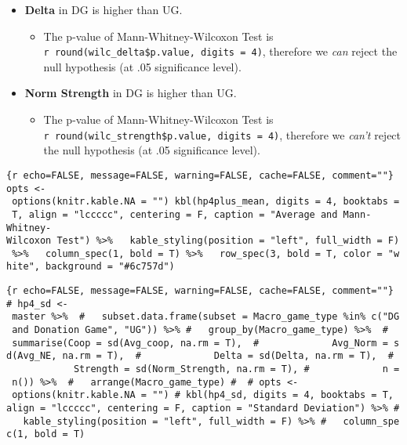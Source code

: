\begin{itemize}
\item
  \textbf{Delta} in DG is higher than UG.

  \begin{itemize}
  \tightlist
  \item
    The p-value of Mann-Whitney-Wilcoxon Test is
    \texttt{r\ round(wilc\_delta\$p.value,\ digits\ =\ 4)}, therefore we
    \emph{can} reject the null hypothesis (at .05 significance level).
  \end{itemize}
\item
  \textbf{Norm Strength} in DG is higher than UG.

  \begin{itemize}
  \tightlist
  \item
    The p-value of Mann-Whitney-Wilcoxon Test is
    \texttt{r\ round(wilc\_strength\$p.value,\ digits\ =\ 4)}, therefore
    we \emph{can't} reject the null hypothesis (at .05 significance
    level).
  \end{itemize}
\end{itemize}

\texttt{\{r\ echo=FALSE,\ message=FALSE,\ warning=FALSE,\ cache=FALSE,\ comment=""\}\ opts\ \textless{}-\ options(knitr.kable.NA\ =\ "")\ kbl(hp4plus\_mean,\ digits\ =\ 4,\ booktabs\ =\ T,\ align\ =\ "lccccc",\ centering\ =\ F,\ caption\ =\ "Average\ and\ Mann-Whitney-Wilcoxon\ Test")\ \%\textgreater{}\%\ \ \ kable\_styling(position\ =\ "left",\ full\_width\ =\ F)\ \%\textgreater{}\%\ \ \ column\_spec(1,\ bold\ =\ T)\ \%\textgreater{}\%\ \ \ row\_spec(3,\ bold\ =\ T,\ color\ =\ "white",\ background\ =\ "\#6c757d")}

\texttt{\{r\ echo=FALSE,\ message=FALSE,\ warning=FALSE,\ cache=FALSE,\ comment=""\}\ \#\ hp4\_sd\ \textless{}-\ master\ \%\textgreater{}\%\ \ \#\ \ \ subset.data.frame(subset\ =\ Macro\_game\_type\ \%in\%\ c("DG\ and\ Donation\ Game",\ "UG"))\ \%\textgreater{}\%\ \#\ \ \ group\_by(Macro\_game\_type)\ \%\textgreater{}\%\ \ \#\ \ \ summarise(Coop\ =\ sd(Avg\_coop,\ na.rm\ =\ T),\ \ \#\ \ \ \ \ \ \ \ \ \ \ \ \ Avg\_Norm\ =\ sd(Avg\_NE,\ na.rm\ =\ T),\ \ \#\ \ \ \ \ \ \ \ \ \ \ \ \ Delta\ =\ sd(Delta,\ na.rm\ =\ T),\ \ \#\ \ \ \ \ \ \ \ \ \ \ \ \ Strength\ =\ sd(Norm\_Strength,\ na.rm\ =\ T),\ \#\ \ \ \ \ \ \ \ \ \ \ \ \ n\ =\ n())\ \%\textgreater{}\%\ \ \#\ \ \ arrange(Macro\_game\_type)\ \#\ \ \#\ opts\ \textless{}-\ options(knitr.kable.NA\ =\ "")\ \#\ kbl(hp4\_sd,\ digits\ =\ 4,\ booktabs\ =\ T,\ align\ =\ "lccccc",\ centering\ =\ F,\ caption\ =\ "Standard\ Deviation")\ \%\textgreater{}\%\ \#\ \ \ kable\_styling(position\ =\ "left",\ full\_width\ =\ F)\ \%\textgreater{}\%\ \#\ \ \ column\_spec(1,\ bold\ =\ T)}

